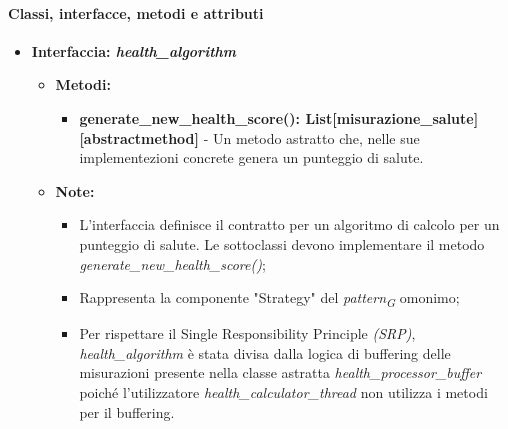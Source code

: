 \paragraph{Classi, interfacce, metodi e attributi}
\begin{itemize}
    \item{\textbf{Interfaccia: \textit{health\_algorithm}}}
    \begin{itemize}
    \item \textbf{Metodi:}
    \begin{itemize}
        \item \textbf{generate\_new\_health\_score(): List[misurazione\_salute] [abstractmethod]} - Un metodo astratto che, nelle sue implementezioni concrete genera un punteggio di salute.
    \end{itemize}
    \item\textbf{Note:}
        \begin{itemize}
            \item L'interfaccia definisce il contratto per un algoritmo di calcolo per un punteggio di salute. Le sottoclassi devono implementare il metodo \textit{generate\_new\_health\_score()};
            \item Rappresenta la componente "Strategy" del \textit{pattern}\textsubscript{\textit{G}} omonimo;
            \item Per rispettare il Single Responsibility Principle \textit{(SRP)}, \textit{health\_algorithm} è stata divisa dalla logica di buffering delle misurazioni presente nella classe astratta \textit{health\_processor\_buffer} poiché l'utilizzatore \textit{health\_calculator\_thread} non utilizza i metodi per il buffering.
        \end{itemize}
    \end{itemize}


\end{itemize}
